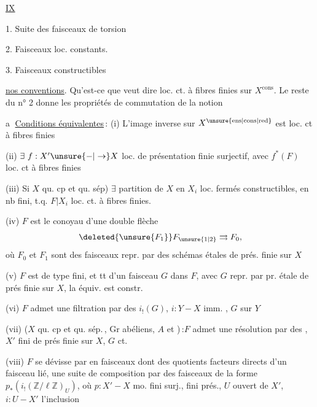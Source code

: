  \uline{IX}

1. Suite des faisceaux de torsion

2. Faisceaux loc. constants.

3. Faisceaux constructibles

\uline{ nos conventions}. Qu'est-ce que veut dire loc. ct. à fibres finies sur $X^{\mathrm{cons}}$. Le reste du n° 2 donne les propriétés de commutation de la notion

\textcircled{a} \uline{Conditions équivalentes}\,: (i) L'image inverse sur $X^{\unsure{\mathrm{ens}|\mathrm{cons}|\mathrm{red}}}$ est loc. ct à fibres finies

(ii) $\exists\ f:X'\unsure{-|\to}X$ loc. de présentation finie surjectif, avec $f^*(F)$ loc. ct à fibres finies

(iii)  Si $X$ qu. cp et qu. sép) $\exists$ partition de $X$ en $X_i$ loc. fermés constructibles, en nb fini, t.q. $F|X_i$ loc. ct. à fibres finies.

(iv)  $F$ est le conoyau d'une double flèche
\[
\deleted{\unsure{F_1}} F_{\unsure{1|2}}\rightrightarrows F_0,
\]
où $F_0$ et $F_{1}$ sont des faisceaux repr. par des schémas étales de prés. finie sur $X$

(v)  $F$ est    de type fini, et tt  d'un faisceau  $G$ dans $F$, avec $G$ repr. par pr. étale de prés finie sur $X$,  la  équiv. est constr.

(vi)  $F$ admet une filtration par des $i_!(G)$, $i:Y-X$ imm.  , $G$  sur $Y$

(vii) ($X$ qu. cp et qu. sép.\,, Gr abéliens, $A$ et )\,:\enspace $F$ admet une  résolution  par des , $X'$ fini de prés finie sur $X$, $G$ ct. 


 (viii)  $F$ se dévisse par    en faisceaux  dont des quotients facteurs directs d'un faisceau lié,  une suite de composition par des faisceaux de la forme $p_*(i_!(\mathbb Z/\ell\mathbb Z)_U)$, où $p:X'-X$ mo. fini surj., fini   prés., $U$ ouvert  de $X'$, $i:U-X'$ l'inclusion

